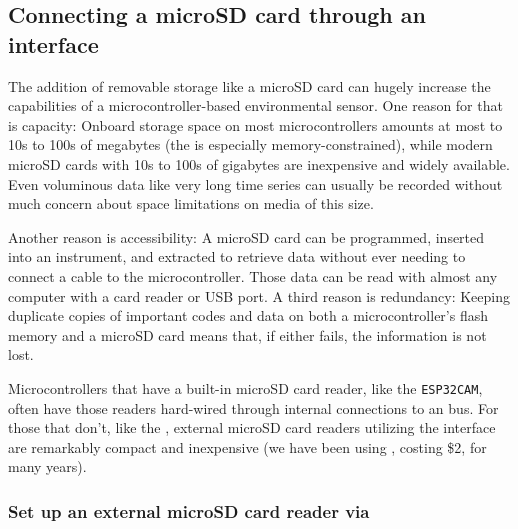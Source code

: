 \subsection{Connecting a microSD card through an \spi interface}
The addition of removable storage like a microSD card can hugely increase the capabilities of a microcontroller-based environmental sensor.
One reason for that is capacity: Onboard storage space on most microcontrollers amounts at most to 10s to 100s of megabytes (the  is especially memory-constrained), while modern microSD cards with 10s to 100s of gigabytes are inexpensive and widely available.
Even voluminous data like very long time series can usually be recorded without much concern about space limitations on media of this size.

Another reason is accessibility: A microSD card can be programmed, inserted into an instrument, and extracted to retrieve data without ever needing to connect a cable to the microcontroller.
Those data can be read with almost any computer with a card reader or USB port.
A third reason is redundancy: Keeping duplicate copies of important codes and data on both a microcontroller's flash memory and a microSD card means that, if either fails, the information is not lost.

Microcontrollers that have a built-in microSD card reader, like the \texttt{ESP32CAM}, often have those readers hard-wired through internal connections to an \spi bus.
For those that don't, like the , external microSD card readers utilizing the \spi interface are remarkably compact and inexpensive (we have been using , costing \$2, for many years).

\subsubsection{\howto Set up an external microSD card reader via \spi}

